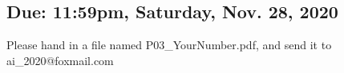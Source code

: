 \documentclass[a4paper, 11pt]{article}
\begin{document}
\begin{enumerate}
\section{Due: 11:59pm, Saturday, Nov. 28, 2020}

 Please hand in a file named \textsf{P03\_YourNumber.pdf}, and send it to \textsf{ai\_2020@foxmail.com}
\end{enumerate}
\end{document}
